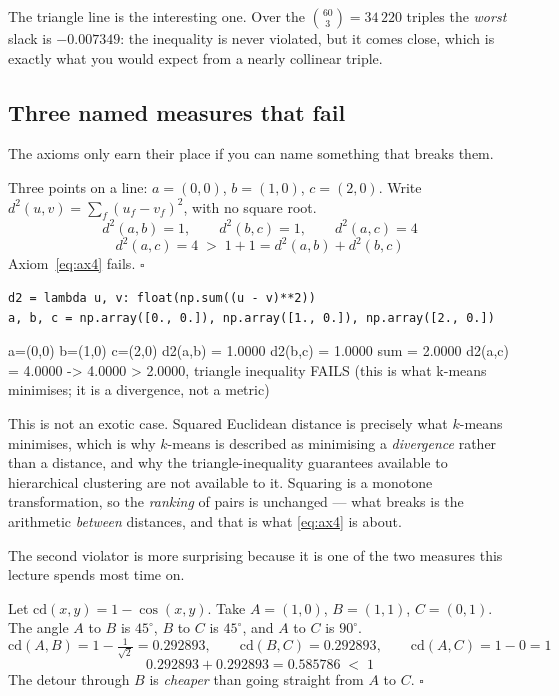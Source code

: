 \documentclass[11pt]{article}
\begin{document}
The triangle line is the interesting one. Over the $\binom{60}{3} = 34\,220$
triples the \emph{worst} slack is $-0.007349$: the inequality is never
violated, but it comes close, which is exactly what you would expect from a
nearly collinear triple.

\subsection{Three named measures that fail}
\label{sec:violators}

The axioms only earn their place if you can name something that breaks them.

\begin{worked}
Three points on a line: $a = (0,0)$, $b = (1,0)$, $c = (2,0)$. Write
$d^2(u,v) = \sum_f (u_f - v_f)^2$, with no square root.
\[
  d^2(a,b) = 1, \qquad d^2(b,c) = 1, \qquad d^2(a,c) = 4
\]
\[
  d^2(a,c) = 4 \;>\; 1 + 1 = d^2(a,b) + d^2(b,c)
\]
Axiom~\eqref{eq:ax4} fails. \ensuremath{\square}
\end{worked}

\begin{lstlisting}
d2 = lambda u, v: float(np.sum((u - v)**2))
a, b, c = np.array([0., 0.]), np.array([1., 0.]), np.array([2., 0.])
\end{lstlisting}
\begin{codeout}
a=(0,0)  b=(1,0)  c=(2,0)
d2(a,b) = 1.0000   d2(b,c) = 1.0000   sum = 2.0000
d2(a,c) = 4.0000   -> 4.0000 > 2.0000, triangle inequality FAILS
(this is what k-means minimises; it is a divergence, not a metric)
\end{codeout}

This is not an exotic case. Squared Euclidean distance is precisely what
$k$-means minimises, which is why $k$-means is described as minimising a
\emph{divergence} rather than a distance, and why the triangle-inequality
guarantees available to hierarchical clustering are not available to it.
Squaring is a monotone transformation, so the \emph{ranking} of pairs is
unchanged --- what breaks is the arithmetic \emph{between} distances, and
that is what \eqref{eq:ax4} is about.

The second violator is more surprising because it is one of the two measures
this lecture spends most time on.

\begin{worked}
Let $\mathrm{cd}(x,y) = 1 - \cos(x,y)$. Take $A = (1,0)$, $B = (1,1)$,
$C = (0,1)$. The angle $A$ to $B$ is $45^\circ$, $B$ to $C$ is $45^\circ$,
and $A$ to $C$ is $90^\circ$.
\[
  \mathrm{cd}(A,B) = 1 - \tfrac{1}{\sqrt2} = 0.292893, \qquad
  \mathrm{cd}(B,C) = 0.292893, \qquad
  \mathrm{cd}(A,C) = 1 - 0 = 1
\]
\[
  0.292893 + 0.292893 = 0.585786 \;<\; 1
\]
The detour through $B$ is \emph{cheaper} than going straight from $A$ to $C$.
\ensuremath{\square}
\end{worked}
\end{document}
